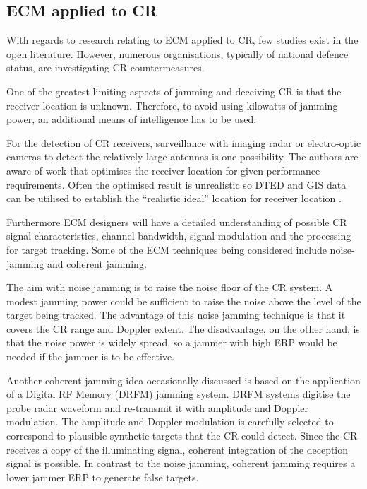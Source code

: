 


\subsection{ECM applied to CR}
With regards to research relating to ECM applied to CR, few studies exist in the open literature. However, numerous organisations, typically of national defence status, are investigating CR countermeasures. 

One of the greatest limiting aspects of jamming and deceiving CR is that the receiver location is unknown. Therefore, to avoid using kilowatts of jamming power, an additional means of intelligence has to be used.

For the detection of CR receivers, surveillance with imaging radar or electro-optic cameras to detect the relatively large antennas is one possibility. The authors are aware of work that optimises the receiver location for given performance requirements. Often the optimised result is unrealistic so DTED and GIS data can be utilised to establish the ``realistic ideal'' location for receiver location \cite{hoyuela2005}.

Furthermore ECM designers will have a detailed understanding of possible CR signal characteristics, channel bandwidth, signal modulation and the processing for target
tracking. Some of the ECM techniques being considered include noise-jamming and coherent jamming.

The aim with noise jamming is to raise the noise floor of the CR system. A modest jamming power could be sufficient to raise the noise above the level of the target being tracked. The advantage of this noise jamming technique is that it covers the CR range and Doppler extent. The disadvantage, on the other hand, is that the noise power is widely spread, so a jammer with high ERP would be needed if the jammer is to be effective. 

Another coherent jamming idea occasionally discussed is based on the application of a Digital RF Memory (DRFM) jamming system. DRFM systems digitise the probe radar waveform and re-transmit it with amplitude and Doppler modulation. The amplitude and Doppler modulation is carefully selected to correspond to plausible synthetic targets that the CR could detect. Since the CR receives a copy of the illuminating signal, coherent integration of the deception signal is possible. In contrast to the noise jamming, coherent jamming requires a lower jammer ERP to generate false targets.

